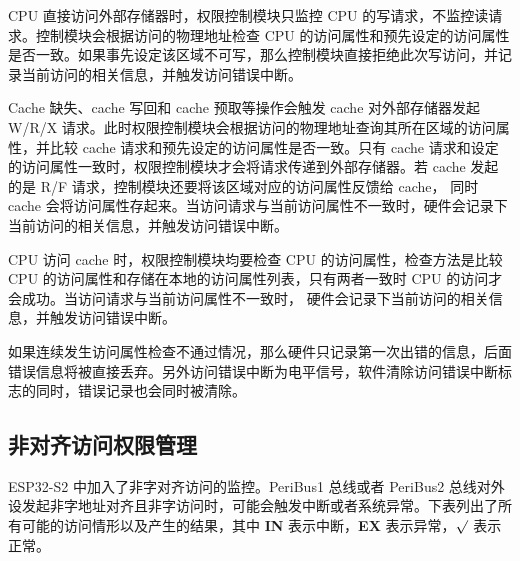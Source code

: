 \documentclass[main\_\_CN.tex]{subfiles}
\begin{document}
CPU 直接访问外部存储器时，权限控制模块只监控 CPU 的写请求，不监控读请求。控制模块会根据访问的物理地址检查 CPU 的访问属性和预先设定的访问属性是否一致。如果事先设定该区域不可写，那么控制模块直接拒绝此次写访问，并记录当前访问的相关信息，并触发访问错误中断。

Cache 缺失、cache 写回和 cache 预取等操作会触发 cache 对外部存储器发起 W/R/X 请求。此时权限控制模块会根据访问的物理地址查询其所在区域的访问属性，并比较 cache 请求和预先设定的访问属性是否一致。只有 cache 请求和设定的访问属性一致时，权限控制模块才会将请求传递到外部存储器。若 cache 发起的是 R/F 请求，控制模块还要将该区域对应的访问属性反馈给 cache， 同时 cache 会将访问属性存起来。当访问请求与当前访问属性不一致时，硬件会记录下当前访问的相关信息，并触发访问错误中断。

CPU 访问 cache 时，权限控制模块均要检查 CPU 的访问属性，检查方法是比较 CPU 的访问属性和存储在本地的访问属性列表，只有两者一致时 CPU 的访问才会成功。当访问请求与当前访问属性不一致时， 硬件会记录下当前访问的相关信息，并触发访问错误中断。

如果连续发生访问属性检查不通过情况，那么硬件只记录第一次出错的信息，后面错误信息将被直接丢弃。另外访问错误中断为电平信号，软件清除访问错误中断标志的同时，错误记录也会同时被清除。

\subsection{非对齐访问权限管理}
ESP32-S2 中加入了非字对齐访问的监控。PeriBus1 总线或者 PeriBus2 总线对外设发起非字地址对齐且非字访问时，可能会触发中断或者系统异常。下表列出了所有可能的访问情形以及产生的结果，其中 {\bfseries IN} 表示中断，{\bfseries EX} 表示异常，{\bfseries $\surd$} 表示正常。
\end{document}
